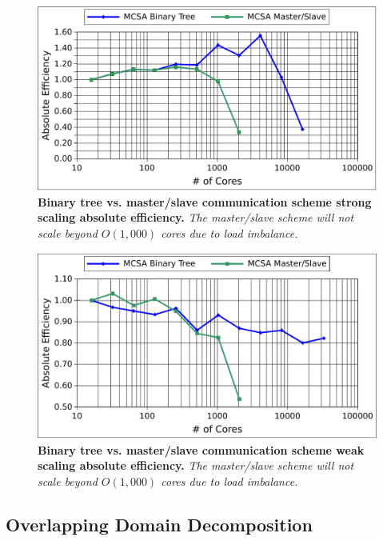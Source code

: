 \begin{figure}[t!]
  \begin{center}
    \includegraphics[width=6in]{chapters/parallel_mc/titan_strong_bvsm.pdf}
  \end{center}
  \caption{\textbf{Binary tree vs. master/slave communication scheme
      strong scaling absolute efficiency.} \textit{The master/slave
      scheme will not scale beyond $O(1,000)$ cores due to load
      imbalance.}}
  \label{fig:titan_strong_bvsm}
\end{figure}

\begin{figure}[t!]
  \begin{center}
    \includegraphics[width=6in]{chapters/parallel_mc/titan_weak_bvsm.pdf}
  \end{center}
  \caption{\textbf{Binary tree vs. master/slave communication scheme
      weak scaling absolute efficiency.}  \textit{The master/slave
      scheme will not scale beyond $O(1,000)$ cores due to load
      imbalance.}}
  \label{fig:titan_weak_bvsm}
\end{figure}

\subsection{Overlapping Domain Decomposition}
\label{subsec:overlapping_domain_decomp}

